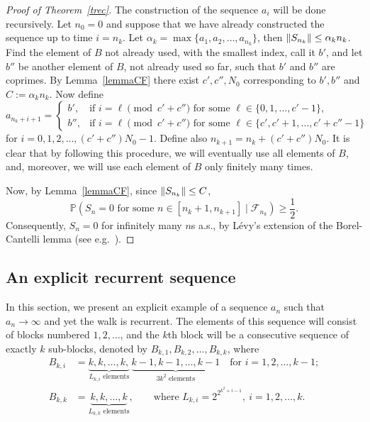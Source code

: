 \documentclass[12pt]{article}
\renewcommand\P{\mathbb{P}}
\newcommand\F{\mathcal{F}}
\DeclarePairedDelimiter{\norm}{\lVert}{\rVert}
\begin{document}
\begin{proof}[Proof of Theorem~\ref{trec}]
The construction of the sequence $a_i$ will be done recursively. Let $n_0=0$ and suppose that we have already constructed the sequence up to time $i=n_k$. Let $\alpha_k=\max\{a_1,a_2,\dots,a_{n_k}\}$, then $\norm{S_{n_k}}\le \alpha_k n_k$. Find the element of $B$ not already used, with the smallest index, call it $b'$, and let $b''$ be another element of $B$, not already used so far, such that $b'$ and $b''$ are coprimes. By Lemma~\ref{lemmaCF} there exist $c',c'',N_0$ corresponding to $b',b''$ and $C:=\alpha_k n_k$. Now define
$$
a_{n_k+i+1}=\begin{cases}
b',&\text{if } i=\ell\pmod{c'+c''}\text{ for some }\ell\in\{0,1,\dots,c'-1\} ,\\
b'',&\text{if } i=\ell \pmod{c'+c''} \text{ for some }\ell\in\{c',c'+1,\dots,c'+c''-1\} 
\end{cases}
$$
for $i=0,1,2,\dots, (c'+c'')N_0-1$. Define also $n_{k+1}=n_k+(c'+c'')N_0$. It is clear that by following this procedure, we will eventually use all elements of $B$, and, moreover, we will use each element of $B$ only finitely many times.

Now, by Lemma~\ref{lemmaCF}, since $\norm{S_{n_k}}\le C$,
$$
\P(S_n=0\text{ for some }n\in[n_k+1,n_{k+1}]\mid \F_{n_k})\ge \frac 12.
$$
Consequently, $S_n=0$ for infinitely many $n$s a.s., by Lévy's extension of the Borel-Cantelli lemma 
(see e.g.~\cite{WIL}).
\end{proof}

\subsection{An explicit recurrent sequence}
In this section, we present an explicit example of a sequence $a_n$ such that $a_n\to\infty$ and yet the walk is recurrent. The elements of this sequence will consist of blocks numbered $1,2,\dots$, and the $k$th block will be a consecutive sequence of exactly $k$ sub-blocks, denoted by $B_{k,1},B_{k,2},\dots,B_{k,k}$, where
\begin{align*}
B_{k,i}&=\underbrace{k,k,\dots,k,}_{L_{k,i}\text{ elements}}\, 
\underbrace{k-1,k-1,\dots,k-1}_{3k^2\text{ elements}}
\quad\text{for }i=1,2,\dots,k-1;
\\
B_{k,k}&=\underbrace{k,k,\dots,k}_{L_{k,k}\text{ elements}},
\qquad \text{where }L_{k,i}=2^{2^{k^2+i-1}},\ i=1,2,\dots,k.
\end{align*}
\end{document}
